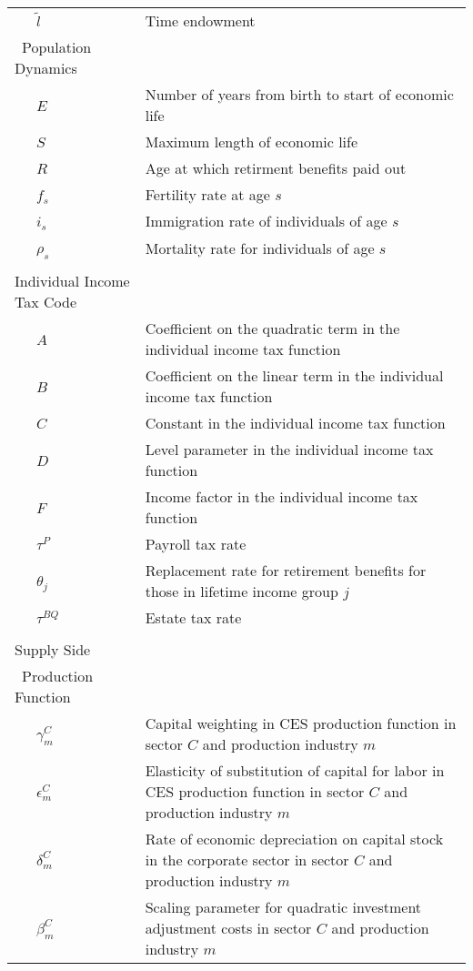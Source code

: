 \documentclass[letterpaper,12pt]{article}
\theoremstyle{definition}
\begin{document}
\begin{table}[h!]
\begin{tabular}{ll}
    \ \ \ $\tilde{l}$ & Time endowment \\
    \ Population Dynamics &  \\
    \ \ \ $E$ & Number of years from birth to start of economic life \\
    \ \ \ $S$ & Maximum length of economic life \\
    \ \ \ $R$ & Age at which retirment benefits paid out \\
    \ \ \ $f_{s}$ & Fertility rate at age $s$ \\
    \ \ \ $i_{s}$ & Immigration rate of individuals of age $s$ \\
    \ \ \ $\rho_{s}$ & Mortality rate for individuals of age $s$ \\
          &  \\
    Individual Income Tax Code &  \\
    \ \ \ $A$ & Coefficient on the quadratic term in the individual income tax function \\
    \ \ \ $B$ & Coefficient on the linear term in the individual income tax function \\
    \ \ \ $C$ & Constant in the individual income tax function \\
    \ \ \ $D$ & Level parameter in the individual income tax function \\
    \ \ \ $F$ & Income factor in the individual income tax function \\
    \ \ \ $\tau^{P}$ & Payroll tax rate \\
    \ \ \ $\theta_{j}$ & Replacement rate for retirement benefits for those in lifetime income group $j$ \\
    \ \ \ $\tau^{BQ}$ & Estate tax rate \\
          &  \\
    Supply Side &  \\
    \ Production Function &  \\
    \ \ \ $\gamma^{C}_{m}$ & Capital weighting in CES production function in sector $C$ and production industry $m$ \\
    \ \ \ $\epsilon^{C}_{m}$ & Elasticity of substitution of capital for labor in CES production function in sector $C$ and production industry $m$ \\
    \ \ \ $\delta^{C}_{m}$ & Rate of economic depreciation on capital stock in the corporate sector in sector $C$ and production industry $m$ \\
    \ \ \ $\beta^{C}_{m}$ & Scaling parameter for quadratic investment adjustment costs in sector $C$ and production industry $m$ \\

\end{tabular}
\end{table}
\end{document}
